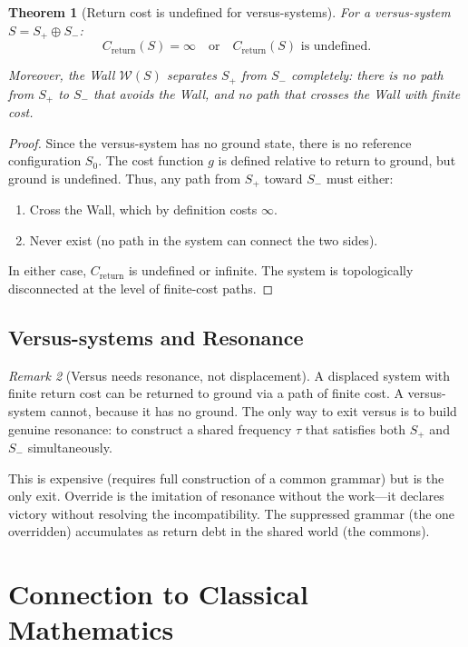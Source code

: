 \documentclass[12pt]{article}
\newtheorem{theorem}{Theorem}[section]
\theoremstyle{definition}
\theoremstyle{remark}
\newtheorem{remark}[theorem]{Remark}
\begin{document}
\begin{theorem}[Return cost is undefined for versus-systems]
\label{thm:versus-cost-undefined}
For a versus-system $S = S_+ \oplus S_-$:
\[
C_{\text{return}}(S) = \infty \quad \text{or} \quad C_{\text{return}}(S) \text{ is undefined}.
\]

Moreover, the Wall $\mathcal{W}(S)$ separates $S_+$ from $S_-$ completely: there is no path from $S_+$ to $S_-$ that avoids the Wall, and no path that crosses the Wall with finite cost.
\end{theorem}

\begin{proof}
Since the versus-system has no ground state, there is no reference configuration $S_0$. The cost function $g$ is defined relative to return to ground, but ground is undefined. Thus, any path from $S_+$ toward $S_-$ must either:
\begin{enumerate}
\item Cross the Wall, which by definition costs $\infty$.
\item Never exist (no path in the system can connect the two sides).
\end{enumerate}

In either case, $C_{\text{return}}$ is undefined or infinite. The system is topologically disconnected at the level of finite-cost paths.
\end{proof}

\subsection{Versus-systems and Resonance}

\begin{remark}[Versus needs resonance, not displacement]
A displaced system with finite return cost can be returned to ground via a path of finite cost. A versus-system cannot, because it has no ground. The only way to exit versus is to build genuine resonance: to construct a shared frequency $\tau$ that satisfies both $S_+$ and $S_-$ simultaneously.

This is expensive (requires full construction of a common grammar) but is the only exit. Override is the imitation of resonance without the work---it declares victory without resolving the incompatibility. The suppressed grammar (the one overridden) accumulates as return debt in the shared world (the commons).
\end{remark}

\section{Connection to Classical Mathematics}
\end{document}
